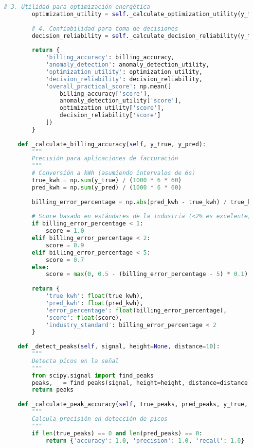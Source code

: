 \begin{lstlisting}[language=Python, caption=Framework integral de evaluación]
        # 3. Utilidad para optimización energética
        optimization_utility = self._calculate_optimization_utility(y_true, y_pred, device_type)
        
        # 4. Confiabilidad para toma de decisiones
        decision_reliability = self._calculate_decision_reliability(y_true, y_pred)
        
        return {
            'billing_accuracy': billing_accuracy,
            'anomaly_detection': anomaly_detection_utility,
            'optimization_utility': optimization_utility,
            'decision_reliability': decision_reliability,
            'overall_practical_score': np.mean([
                billing_accuracy['score'],
                anomaly_detection_utility['score'],
                optimization_utility['score'],
                decision_reliability['score']
            ])
        }
    
    def _calculate_billing_accuracy(self, y_true, y_pred):
        """
        Precisión para aplicaciones de facturación
        """
        # Conversión a kWh (asumiendo intervalos de 6s)
        true_kwh = np.sum(y_true) / (1000 * 6 * 60)
        pred_kwh = np.sum(y_pred) / (1000 * 6 * 60)
        
        billing_error_percentage = np.abs(pred_kwh - true_kwh) / true_kwh * 100
        
        # Score basado en estándares de la industria (<2% es excelente)
        if billing_error_percentage < 1:
            score = 1.0
        elif billing_error_percentage < 2:
            score = 0.9
        elif billing_error_percentage < 5:
            score = 0.7
        else:
            score = max(0, 0.5 - (billing_error_percentage - 5) * 0.1)
        
        return {
            'true_kwh': float(true_kwh),
            'pred_kwh': float(pred_kwh),
            'error_percentage': float(billing_error_percentage),
            'score': float(score),
            'industry_standard': billing_error_percentage < 2
        }
    
    def _detect_peaks(self, signal, height=None, distance=10):
        """
        Detecta picos en la señal
        """
        from scipy.signal import find_peaks
        peaks, _ = find_peaks(signal, height=height, distance=distance)
        return peaks
    
    def _calculate_peak_accuracy(self, true_peaks, pred_peaks, y_true, y_pred):
        """
        Calcula precisión en detección de picos
        """
        if len(true_peaks) == 0 and len(pred_peaks) == 0:
            return {'accuracy': 1.0, 'precision': 1.0, 'recall': 1.0}
        

\end{lstlisting}
